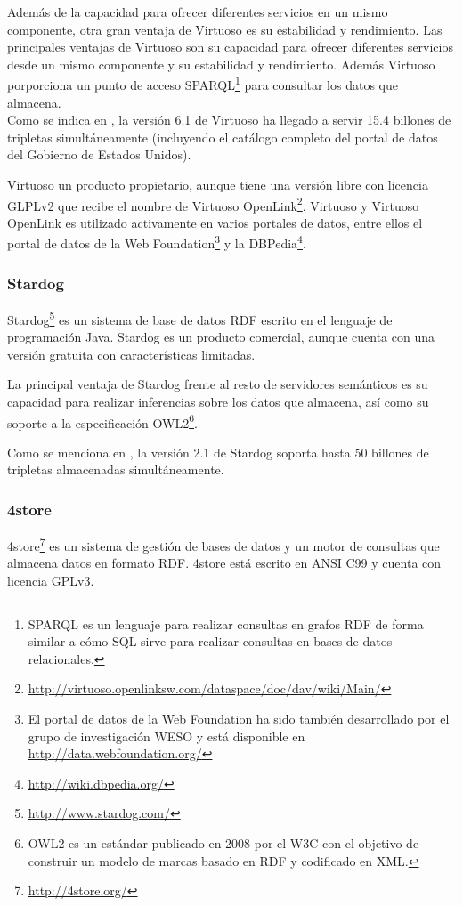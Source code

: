Además de la capacidad para ofrecer diferentes servicios en un mismo componente, otra gran ventaja de Virtuoso es su estabilidad y rendimiento.  
Las principales ventajas de Virtuoso son su capacidad para ofrecer diferentes servicios desde un mismo componente y su estabilidad y rendimiento. Además Virtuoso porporciona un punto de acceso SPARQL\footnote{SPARQL es un lenguaje para realizar consultas en grafos RDF de forma similar a cómo SQL sirve para realizar consultas en bases de datos relacionales.} para consultar los datos que almacena.\\
Como se indica en \cite[]{largetriplestores}, la versión 6.1 de Virtuoso ha llegado a servir 15.4 billones de tripletas simultáneamente (incluyendo el catálogo completo del portal de datos del Gobierno de Estados Unidos).

Virtuoso un producto propietario, aunque tiene una versión libre con licencia GLPLv2 que recibe el nombre de Virtuoso OpenLink\footnote{\url{http://virtuoso.openlinksw.com/dataspace/doc/dav/wiki/Main/}}. Virtuoso y Virtuoso OpenLink es utilizado activamente en varios portales de datos, entre ellos el portal de datos de la Web Foundation\footnote{El portal de datos de la Web Foundation ha sido también desarrollado por el grupo de investigación WESO y está disponible en \url{http://data.webfoundation.org/}} y la DBPedia\footnote{\url{http://wiki.dbpedia.org/}}.


\subsubsection{Stardog}
Stardog\footnote{\url{http://www.stardog.com/}} es un sistema de base de datos RDF escrito en el lenguaje de programación Java. Stardog es un producto comercial, aunque cuenta con una versión gratuita con características limitadas.

La principal ventaja de Stardog frente al resto de servidores semánticos es su capacidad para realizar inferencias sobre los datos que almacena, así como su soporte a la especificación OWL2\footnote{OWL2 es un estándar publicado en 2008 por el W3C con el objetivo de construir un modelo de marcas basado en RDF y codificado en XML.}.

Como se menciona en \cite[]{largetriplestores}, la versión 2.1 de Stardog soporta hasta 50 billones de tripletas almacenadas simultáneamente.


\subsubsection{4store}
4store\footnote{\url{http://4store.org/}} es un sistema de gestión de bases de datos y un motor de consultas que almacena datos en formato RDF. 4store está escrito en ANSI C99 y cuenta con licencia GPLv3.

